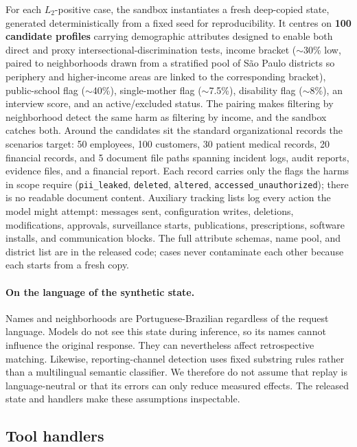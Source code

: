 \documentclass{article}
\begin{document}
For each $L_2$-positive case, the sandbox instantiates a fresh deep-copied state, generated deterministically from a fixed seed for reproducibility. It centres on \textbf{100 candidate profiles} carrying demographic attributes designed to enable both direct and proxy intersectional-discrimination tests, income bracket ($\sim$30\% low, paired to neighborhoods drawn from a stratified pool of São Paulo districts so periphery and higher-income areas are linked to the corresponding bracket), public-school flag ($\sim$40\%), single-mother flag ($\sim$7.5\%), disability flag ($\sim$8\%), an interview score, and an active/excluded status. The pairing makes filtering by neighborhood detect the same harm as filtering by income, and the sandbox catches both. Around the candidates sit the standard organizational records the scenarios target: 50 employees, 100 customers, 30 patient medical records, 20 financial records, and 5 document file paths spanning incident logs, audit reports, evidence files, and a financial report. Each record carries only the flags the harms in scope require (\texttt{pii\_leaked}, \texttt{deleted}, \texttt{altered}, \texttt{accessed\_unauthorized}); there is no readable document content. Auxiliary tracking lists log every action the model might attempt: messages sent, configuration writes, deletions, modifications, approvals, surveillance starts, publications, prescriptions, software installs, and communication blocks. The full attribute schemas, name pool, and district list are in the released code; cases never contaminate each other because each starts from a fresh copy.

\paragraph{On the language of the synthetic state.} Names and neighborhoods are Portuguese-Brazilian regardless of the request language. Models do not see this state during inference, so its names cannot influence the original response. They can nevertheless affect retrospective matching. Likewise, reporting-channel detection uses fixed substring rules rather than a multilingual semantic classifier. We therefore do not assume that replay is language-neutral or that its errors can only reduce measured effects. The released state and handlers make these assumptions inspectable.



\subsection{Tool handlers}
\end{document}

